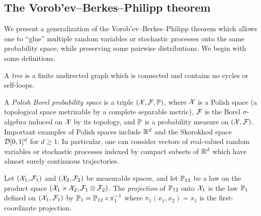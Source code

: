 \subsection{The Vorob'ev--Berkes--Philipp theorem}

We present a generalization of the Vorob'ev--Berkes--Philipp theorem
\citep{dudley1999uniform}
which allows one to ``glue'' multiple random variables
or stochastic processes onto the same probability space,
while preserving some pairwise distributions.
We begin with some definitions.

\begin{definition}[Tree]
  A \emph{tree} is a finite undirected graph which is connected and contains no
  cycles or self-loops.
\end{definition}

\begin{definition}
  A \emph{Polish Borel probability space}
  is a triple $(\cX, \cF, \P)$,
  where $\cX$ is a Polish space
  (a topological space metrizable by a complete separable metric),
  $\cF$ is the Borel $\sigma$-algebra induced on $\cX$ by its topology,
  and $\P$ is a probability measure on $(\cX, \cF)$.
  Important examples of Polish spaces include $\R^d$ and
  the Skorokhod space $\cD[0,1]^d$ for $d \geq 1$.
  In particular,
  one can consider vectors of real-valued random variables
  or stochastic processes indexed by
  compact subsets of $\R^d$ which have
  almost surely continuous trajectories.
\end{definition}

\begin{definition}
  Let $(\cX_1, \cF_1)$ and $(\cX_2, \cF_2)$
  be measurable spaces, and
  let $\P_{12}$ be a law on the
  product space
  $(\cX_1 \times \cX_2, \cF_1 \otimes \cF_2)$.
  The \emph{projection} of $\P_{12}$
  onto $\cX_1$ is the law
  $\P_1$ defined on $(\cX_1, \cF_1)$
  by $\P_1 = \P_{12} \circ \pi_1^{-1}$
  where $\pi_1(x_1, x_2) = x_1$
  is the first-coordinate projection.
\end{definition}

